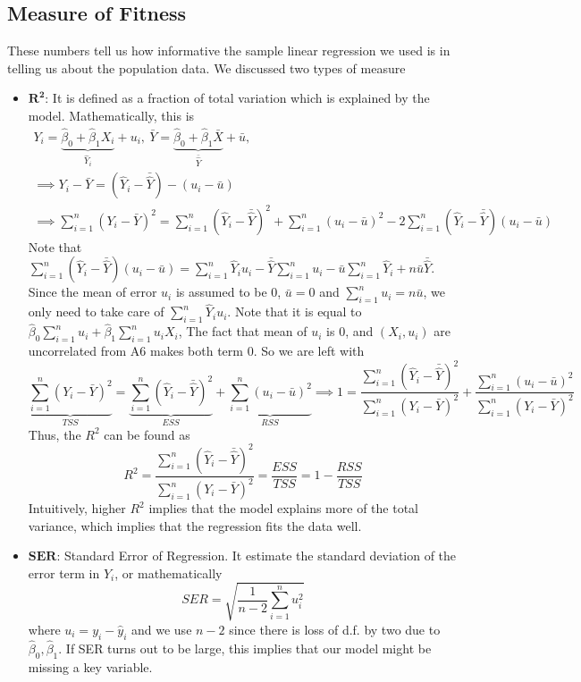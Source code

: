 \documentclass[12pt]{article}
\theoremstyle{definition}
\theoremstyle{property}
\theoremstyle{assumption}
\theoremstyle{example}
\theoremstyle{comment}
\begin{document}
\subsection{Measure of Fitness}
These numbers tell us how informative the sample linear regression we used is in telling us about the population data. We discussed two types of measure
\begin{itemize}
\item $\mathbf{R^2}$: It is defined as a fraction of total variation which is explained by the model. Mathematically, this is
\begin{gather*}
Y_i = \underbrace{\hat{\beta}_0 + \hat{\beta}_1X_i}_{\hat{Y}_i} + u_i, \ \bar{Y} = \underbrace{\hat{\beta}_0 + \hat{\beta}_1\bar{X}}_{\bar{\hat{Y}}} + \bar{u}, \\
\implies Y_i-\bar{Y} = (\hat{Y}_i - \bar{\hat{Y}}) - (u_i - \bar{u}) \\
\implies \sum_{i=1}^n (Y_i-\bar{Y})^2= \sum_{i=1}^n (\hat{Y}_i - \bar{\hat{Y}})^2+\sum_{i=1}^n(u_i - \bar{u})^2 - 2\sum_{i=1}^n(\hat{Y}_i - \bar{\hat{Y}}) (u_i - \bar{u})
\end{gather*}
Note that $\sum_{i=1}^n(\hat{Y}_i - \bar{\hat{Y}}) (u_i - \bar{u})=\sum_{i=1}^n\hat{Y}_i{u}_i-\bar{\hat{Y}}\sum_{i=1}^nu_i -\bar{u}\sum_{i=1}^n\hat{Y}_i +n\bar{u}\bar{\hat{Y}}$. Since the mean of error $u_i$ is assumed to be 0, $\bar{u}=0$ and $\sum_{i=1}^nu_i = n\bar{u}$, we only need to take care of $\sum_{i=1}^n\hat{Y}_i{u}_i$. Note that it is equal to $\hat{\beta}_0\sum_{i=1}^nu_i + \hat{\beta}_1\sum_{i=1}^nu_iX_i$, The fact that mean of $u_i$ is 0, and $(X_i, u_i)$ are uncorrelated from A6 makes both term 0. So we are left with
\[
\underbrace{\sum_{i=1}^n (Y_i-\bar{Y})^2}_{TSS}= \underbrace{\sum_{i=1}^n (\hat{Y}_i - \bar{\hat{Y}})^2}_{ESS}+\underbrace{\sum_{i=1}^n(u_i - \bar{u})^2}_{RSS} \implies 1=\frac{\sum_{i=1}^n (\hat{Y}_i - \bar{\hat{Y}})^2}{\sum_{i=1}^n (Y_i-\bar{Y})^2} + \frac{\sum_{i=1}^n(u_i - \bar{u})^2 }{\sum_{i=1}^n (Y_i-\bar{Y})^2}
\]
Thus, the $R^2$ can be found as
\[
R^2 = \frac{\sum_{i=1}^n (\hat{Y}_i - \bar{\hat{Y}})^2}{\sum_{i=1}^n (Y_i-\bar{Y})^2} = \frac{ESS}{TSS} = 1-\frac{RSS}{TSS}
\]
Intuitively, higher $R^2$ implies that the model explains more of the total variance, which implies that the regression fits the data well. 
\item $\mathbf{SER}$: Standard Error of Regression. It estimate the standard deviation of the error term in $Y_i$, or mathematically
\[
SER = \sqrt{\frac{1}{n-2}\sum_{i=1}^n u_i^2}
\]
where $u_i = y_i-\hat{y}_i$ and we use $n-2$ since there is loss of d.f. by two due to $\hat{\beta}_0, \hat{\beta}_1$. If SER turns out to be large, this implies that our model might be missing a key variable.
\end{itemize}


\end{document}
